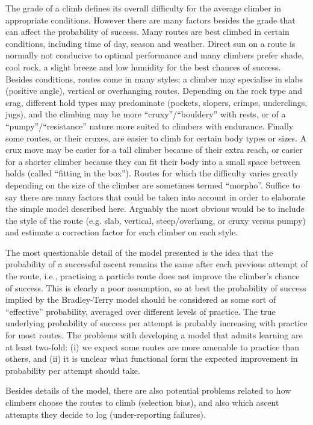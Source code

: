 \documentclass{article}
\begin{document}
{The grade of a climb defines its overall difficulty for the average climber in appropriate conditions. However there are many factors besides the grade that can affect the probability of success. Many routes are best climbed in certain conditions, including time of day, season and weather. Direct sun on a route is normally not conducive to optimal performance and many climbers prefer shade, cool rock, a slight breeze and low humidity for the best chances of success. Besides conditions, routes come in many styles; a climber may specialise in slabs (positive angle), vertical or overhanging routes. Depending on the rock type and crag, different hold types may predominate (pockets, slopers, crimps, underclings, jugs), and the climbing may be more ``cruxy''/``bouldery'' with rests, or of a ``pumpy''/``resistance'' nature more suited to climbers with endurance. Finally some routes, or their cruxes, are easier to climb for certain body types or sizes. A crux move may be easier for a tall climber because of their extra reach, or easier for a shorter climber because they can fit their body into a small space between holds (called ``fitting in the box''). Routes for which the difficulty varies greatly depending on the size of the climber are sometimes termed ``morpho''. Suffice to say there are many factors that could be taken into account in order to elaborate the simple model described here. Arguably the most obvious would be to include the style of the route (e.g. slab, vertical, steep/overhung, or cruxy versus pumpy) and estimate a correction factor for each climber on each style. 

The most questionable detail of the model presented is the idea that the probability of a successful ascent remains the same after each previous attempt of the route, i.e., practising a particle route does not improve the climber's chance of success. This is clearly a poor assumption, so at best the probability of success implied by the Bradley-Terry model should be considered as some sort of ``effective'' probability, averaged over different levels of practice. The true underlying probability of success per attempt is probably increasing with practice for most routes. The problems with developing a model that admits learning are at least two-fold: (i) we expect some routes are more amenable to practice than others, and (ii) it is unclear what functional form the expected improvement in probability per attempt should take.

Besides details of the model, there are also potential problems related to how climbers choose the routes to climb (selection bias), and also which ascent attempts they decide to log (under-reporting failures). 

}
\end{document}
